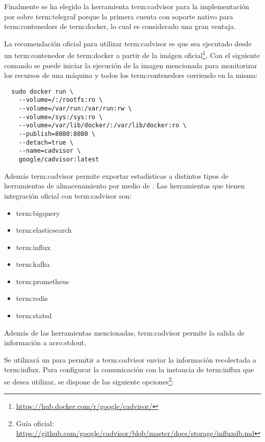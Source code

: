 Finalmente se ha elegido la herramienta \gls{term:cadvisor} para la
implementación por sobre \gls{term:telegraf} porque la primera cuenta con
soporte nativo para \glspl{term:contenedor} de \gls{term:docker}, lo cual es
considerado una gran ventaja.

La recomendación oficial para utilizar \gls{term:cadvisor} es que sea ejecutado
desde un \gls{term:contenedor} de \gls{term:docker} a partir de la imágen
oficial\footnote{\url{https://hub.docker.com/r/google/cadvisor/}}. Con el
siguiente comando se puede iniciar la ejecución de la imagen mencionada para
monitorizar los recursos de una máquina y todos los \glspl{term:contenedor}
corriendo en la misma:

\begin{lstlisting}
  sudo docker run \
    --volume=/:/rootfs:ro \
    --volume=/var/run:/var/run:rw \
    --volume=/sys:/sys:ro \
    --volume=/var/lib/docker/:/var/lib/docker:ro \
    --publish=8080:8080 \
    --detach=true \
    --name=cadvisor \
    google/cadvisor:latest
\end{lstlisting}


Además \gls{term:cadvisor} permite exportar estadísticas a distintos tipos de
herramientas de almacenamiento por medio de . Las herramientas que
tienen integración oficial con \gls{term:cadvisor} son:

\begin{itemize}
  \item \gls{term:bigquery}
  \item \gls{term:elasticsearch}
  \item \gls{term:influx}
  \item \gls{term:kafka}
  \item \gls{term:prometheus}
  \item \gls{term:redis}
  \item \gls{term:statsd}
\end{itemize}

Además de las herramientas mencionadas, \gls{term:cadvisor} permite la salida
de información a \gls{acro:stdout}.

Se utilizará un \eng{plugin} para permitir a \gls{term:cadvisor} enviar la
información recolectada a \gls{term:influx}. Para configurar la comunicación
con la instancia de \gls{term:influx} que se desea utilizar, se dispone de las
siguiente opciones\footnote{Guía oficial:
\url{https://github.com/google/cadvisor/blob/master/docs/storage/influxdb.md}}:

